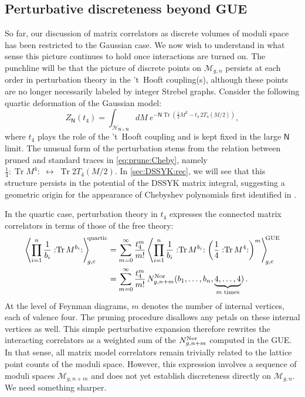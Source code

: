 \documentclass[a4paper,11pt,english]{article}
\theoremstyle{plain}
\theoremstyle{definition}
\theoremstyle{plain}
\newcommand{\cc}{\mathrm{c}}
\DeclareMathOperator{\Tr}{Tr}
\newcommand{\normord}[1]{:\mathrel{#1}:}
\newcommand{\NTr}[1]{\normord{\Tr{#1}}}
\newcommand{\ms}[1]{\mathsf{#1}}
\newcommand{\M}{\mathcal{M}}
\begin{document}
\subsection{Perturbative discreteness beyond GUE}
So far, our discussion of matrix correlators as discrete volumes of moduli space has been restricted to the Gaussian case. We now wish to understand in what sense this picture continues to hold once interactions are turned on. The punchline will be that the picture of discrete points on $\M_{g,n}$ persists at each order in perturbation theory in the 't~Hooft coupling(s), although these points are no longer necessarily labeled by integer Strebel graphs. Consider the following quartic deformation of the Gaussian model:
\begin{equation}
    Z_{\ms{N}}(t_4)
    =
    \int_{\mathcal{H}_{\ms{N} \times \ms{N}}}
        dM \ e^{-\ms{N} \Tr \left( \frac{1}{2} M^2 - t_{4} \, 2T_{4}(M/2)\right) } ,
\end{equation}
where $t_4$ plays the role of the 't~Hooft coupling and is kept fixed in the large $\ms{N}$ limit. The unusual form of the perturbation stems from the relation between pruned and standard traces in \cref{eq:prune:Cheby}, namely $\frac{1}{4}\NTr{M^4} \; \leftrightarrow \; \Tr 2T_{4}(M/2)$. In \cref{sec:DSSYK:rec}, we will see that this structure persists in the potential of the DSSYK matrix integral, suggesting a geometric origin for the appearance of Chebyshev polynomials first identified in \cite{JKMS23}. 

In the quartic case, perturbation theory in $t_{4}$ expresses the connected matrix correlators in terms of those of the free theory:
\begin{equation}
\begin{split}
     \left\langle \prod_{i=1}^n \frac{1}{b_{i}} \NTr{M^{b_{i}}} \right\rangle_{\!\!g,\cc}^{\!\!\textup{quartic}}
     &=
     \sum_{m=0}^{\infty}
        \frac{t_{4}^{m}}{m!}
        \left\langle
            \prod_{i=1}^n \frac{1}{b_{i}} \NTr{M^{b_{i}}}
            \left( \frac{1}{4} \NTr{M^4} \right)^m
        \right\rangle_{\!\!g,\cc}^{\!\!\textup{GUE}} \\
     &=
     \sum_{m=0}^{\infty} \frac{t_{4}^{m}}{m!} \,
        N^{\textup{Nor}}_{g,n+m}(b_1,\ldots,b_{n},\underbrace{4,\ldots,4}_{m\text{ times}}) \, .
\end{split}
\end{equation}
At the level of Feynman diagrams, $m$ denotes the number of internal vertices, each of valence four. The pruning procedure disallows any petals on these internal vertices as well. This simple perturbative expansion therefore rewrites the interacting correlators as a weighted sum of the $N^{\textup{Nor}}_{g,n+m}$ computed in the GUE. In that sense, all matrix model correlators remain trivially related to the lattice point counts of the moduli space. However, this expression involves a sequence of moduli spaces $\M_{g,n+m}$ and does not yet establish discreteness directly on $\M_{g,n}$. We need something sharper.
\end{document}
